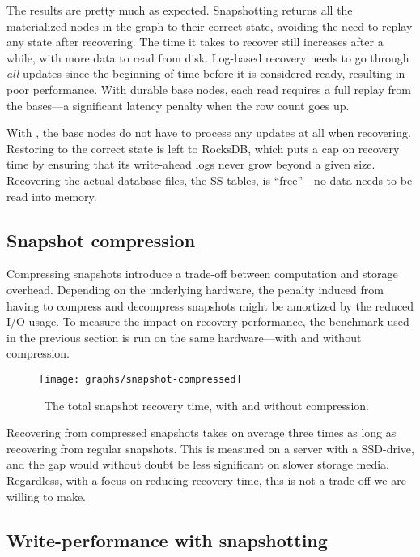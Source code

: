The results are pretty much as expected. Snapshotting returns all the
materialized nodes in the graph to their correct state, avoiding the need to
replay any state after recovering. The time it takes to recover still increases
after a while, with more data to read from disk. Log-based recovery needs to go
through \textit{all} updates since the beginning of time before it is considered
ready, resulting in poor performance. With durable base nodes, each read
requires a full replay from the bases---a significant latency penalty when the
row count goes up.

With , the base nodes do not have to process any updates
at all when recovering. Restoring  to the correct state is
left to RocksDB, which puts a cap on recovery time by ensuring that its
write-ahead logs never grow beyond a given size. Recovering the actual database
files, the SS-tables, is ``free''---no data needs to be read into memory.

\subsection{Snapshot compression}

Compressing snapshots introduce a trade-off between computation and storage
overhead. Depending on the underlying hardware, the penalty induced from having
to compress and decompress snapshots might be amortized by the reduced I/O
usage. To measure the impact on recovery performance, the benchmark used in the
previous section is run on the same hardware---with and without 
compression.

\begin{figure}[H]
  \texttt{[image: graphs/snapshot-compressed]}
  \caption{\
    The total snapshot recovery time, with and without compression.
  }\label{fig:snapshot-compressed}
\end{figure}

Recovering from compressed snapshots takes on average three times as long as
recovering from regular snapshots. This is measured on a server with a
SSD-drive, and the gap would without doubt be less significant on slower storage
media. Regardless, with a focus on reducing recovery time, this is not a
trade-off we are willing to make.

\subsection{Write-performance with snapshotting}\label{sec:snapshot-write}

